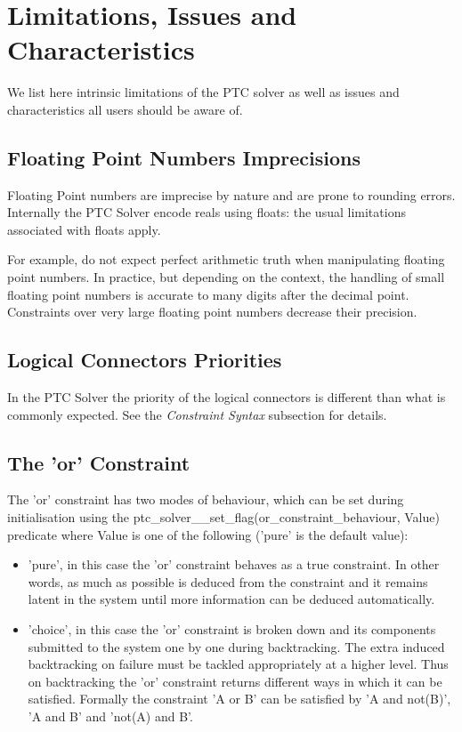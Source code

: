 \documentclass{article}
\begin{document}
\section{Limitations, Issues and Characteristics}
We list here intrinsic limitations of the PTC solver as well as issues and characteristics all users should be aware of.

\subsection{Floating Point Numbers Imprecisions}

Floating Point numbers are imprecise by nature and are prone to rounding errors. Internally the PTC Solver encode reals using floats: the usual limitations associated with floats apply.

For example, do not expect perfect arithmetic truth when manipulating floating point numbers. In practice, but depending on the context, the handling of small floating point numbers is accurate to many digits after the decimal point. Constraints over very large floating point numbers decrease their precision.

\subsection{Logical Connectors Priorities}

In the PTC Solver the priority of the logical connectors is different than what
is commonly expected. See the \textit{Constraint Syntax} subsection for details.

\subsection{The 'or' Constraint}

The 'or' constraint has two modes of behaviour, which can be set during
initialisation using the \linebreak
ptc\_solver\_\_set\_flag(or\_constraint\_behaviour, Value)
predicate where Value is one of the following ('pure' is the default value):

\begin{itemize}
\item 'pure', in this case the 'or' constraint behaves as a true constraint. In other
words, as much as possible is deduced from the constraint and it
remains latent in the system until more information can be deduced
automatically.

\item 'choice', in this case the 'or' constraint is broken down and its components
submitted to the system one by one during backtracking. The extra
induced backtracking on failure must be tackled appropriately at a
higher level. Thus on backtracking the 'or' constraint returns
different ways in which it can be satisfied. Formally the
constraint 'A or B' can be satisfied by 'A and not(B)', 'A and B'
and 'not(A) and B'.
\end{itemize}
\end{document}
